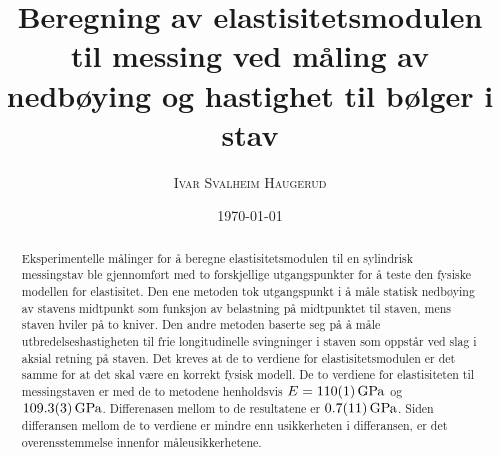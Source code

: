 \documentclass[%
 reprint,
 amsmath,amssymb,
 aps,
 norsk,
 booktabs
]{revtex4-1}
\begin{document}
\title{Beregning av elastisitetsmodulen til messing ved måling av nedbøying og hastighet til bølger i stav}
\author{\textsc{Ivar Svalheim Haugerud}}
\date{\today}

\begin{abstract}
  Eksperimentelle målinger for å beregne elastisitetsmodulen til en sylindrisk messingstav ble gjennomført med to forskjellige utgangspunkter for å teste den fysiske modellen for elastisitet. Den ene metoden tok utgangspunkt i å måle statisk nedbøying av stavens midtpunkt som funksjon av belastning på midtpunktet til staven, mens staven hviler på to kniver. Den andre metoden baserte seg på å måle utbredelseshastigheten til frie longitudinelle svingninger i staven som oppstår ved slag i aksial retning på staven. Det kreves at de to verdiene for elastisitetsmodulen er det samme for at det skal være en korrekt fysisk modell. De to verdiene for elastisiteten til messingstaven er med de to metodene henholdsvis
  $E=\SI{110\pm1}{\giga\pascal}$ og $\SI{109.3\pm0.3}{\giga\pascal}$. Differenasen mellom to de resultatene er $\SI{0.7\pm1.1}{\giga\pascal}$. Siden differansen mellom de to verdiene er mindre enn usikkerheten i differansen, er det overensstemmelse innenfor måleusikkerhetene.
\end{abstract}

\maketitle

\end{document}
